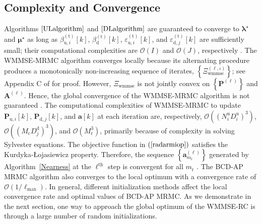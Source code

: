 \documentclass[9pt,journal]{IEEEtran}
\newcommand{\paren}[1]{\left({#1}\right)}
\newcommand{\bracket}[1]{{\left [{#1}\right ]}}
\newcommand{\braces}[1]{{\left\{ {#1}\right\}}}
\newcommand{\ith}[1]    {{#1}^{\underline{\text{th}}}}
\newcommand{\rr}{_\mathrm{r}}
\newcommand{\PiB}{\mathbf{P}_{\textrm{u},i}\bracket{k}}
\newcommand{\PBj}{\mathbf{P}_{\textrm{d},j}\bracket{k}}
\newcommand{\sfrac}[2]{#1/#2}
\theoremstyle{definition}
\begin{document}
\subsection{Complexity and Convergence}
Algorithms $\ref{ULalgorithm}$ and $\ref{DLalgorithm}$ are guaranteed to converge to $\boldsymbol{\lambda}^\star$ and $\boldsymbol{\mu}^\star$ as long as $\beta^{\paren{\mathrm{t}}}_{\textrm{u},i}\bracket{k}$, $\beta^{\paren{\mathrm{t}}}_{\textrm{d}}\bracket{k}$, $\varepsilon^{\paren{\mathrm{t}}}_{\textrm{u},i}\bracket{k}$, and $\varepsilon^{\paren{\mathrm{t}}}_{\textrm{d},j}\bracket{k}$ are sufficiently small; their computational complexities are $\mathcal{O}\paren{\mathit{I}}$ and $\mathcal{O}\paren{\mathit{J}}$, respectively \cite{Lui2006subg}. The WMMSE-MRMC algorithm converges locally because its alternating procedure produces a monotonically non-increasing sequence of iterates, $\braces{\Xi^{\paren{\ell,\iota}}_{\textrm{wmmse}}}$; see Appendix C of \cite{Luo2011IterativeWMMSE} for proof. However, $\Xi_{\textrm{wmmse}}$ is not jointly convex on $\braces{\mathbf{P}^{\paren{\ell}}}$ and $\mathbf{A}^{\paren{\ell}}$. Hence, the global convergence of the WMMSE-MRMC algorithm is not guaranteed \cite{Luo2011IterativeWMMSE,FD_WMMSE}. The computational complexities of WMMSE-MRMC to update $\PiB$, $\PBj$, and $\mathbf{a}\bracket{k}$ at each iteration are, respectively, $\mathcal{O}\paren{\paren{N^\textrm{u}_iD^\textrm{u}_{i}}^3}$, $\mathcal{O}\paren{\paren{M_{\textrm{c}}D^\textrm{d}_{j}}^3}$, and $\mathcal{O}\paren{M_{\textrm{r}}^3}$, primarily because of complexity in solving Sylvester equations. The objective function in $\paren{\ref{radarmiop}}$ satisfies the Kurdyka-\L ojasiewicz property. Therefore, the sequence $\braces{\mathbf{a}^{\paren{\ell}}_{m\rr}}$ generated by Algorithm~\ref{Nearness} at the $\ith{\ell}$ step is convergent for all $m\rr$ \cite{arXiv180203889Z}. The BCD-AP MRMC algorithm also converges to the local optimum with a convergence rate of $\mathcal{O}\paren{\sfrac{1}{\mathrm{\ell}_{\textrm{max}}}}$\cite{BCDconvergence}. 
In general, different initialization methods affect the local convergence rate and optimal values of BCD-AP MRMC. As we demonstrate in the next section, one way to approach the global optimum of the WMMSE-RC is through a large number of random initializations\cite{Luo2011IterativeWMMSE}.
\end{document}
